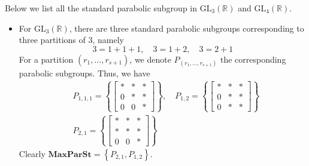 \begin{example}
    Below we list all the standard parabolic subgroup in $\text{GL}_3(\mathbb{R})$ and $\text{GL}_4(\mathbb{R})$.
    \begin{itemize}
        \item For $\text{GL}_3(\mathbb{R})$, there are three standard parabolic subgroups corresponding to
              three partitions of $3$, namely
              \[ 3 = 1+ 1+ 1, \quad 3 =1+2 , \quad 3 = 2+1\]
              For a partition $(r_1,\ldots,r_{s+1})$, we denote $P_{(r_1,\ldots,r_{s+1})}$ the corresponding parabolic subgroups. Thus, we have
              \begin{align*}
                   & P_{1,1,1} = \left\lbrace \begin{bmatrix}
                                                  \ast & \ast & \ast \\
                                                  0    & \ast & \ast \\
                                                  0    & 0    & \ast
                                              \end{bmatrix}\right\rbrace, \quad P_{1,2} =\left\lbrace \begin{bmatrix}
                                                                                                          \ast & \ast & \ast \\
                                                                                                          0    & \ast & \ast \\
                                                                                                          0    & \ast & \ast
                                                                                                      \end{bmatrix}\right\rbrace \\
                   & P_{2,1} = \left\lbrace \begin{bmatrix}
                                                \ast & \ast & \ast \\
                                                \ast & \ast & \ast \\
                                                0    & 0    & \ast
                                            \end{bmatrix}\right\rbrace
              \end{align*}
              Clearly $\textbf{MaxParSt} = \left\lbrace P_{2,1}, P_{1,2}\right\rbrace$.

\end{itemize}
\end{example}
